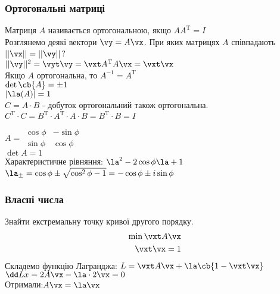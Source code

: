 \subsubsection{Ортогональні матриці}
Матриця $A$ називається ортогональною, якщо $AA^\mathrm{T} = I$\\
Розглянемо деякі вектори $\vy=A\vx$. При яких матрицях $A$ співпадають $||\vx|| = ||\vy||$?\\
$||\vy||^2 = \vyt \vy = \vxt A^\mathrm{T} A \vx = \vxt \vx$\\
Якщо $A$ ортогональна, то $A^{-1} = A^\mathrm{T}$\\
$\det\cb{A}=\pm 1$\\
$|\la(A)|=1$\\
$C=A\cdot B$ - добуток ортогональний також ортогональна.\\
$C^\mathrm{T} \cdot C = B^\mathrm{T} \cdot A^\mathrm{T} \cdot A \cdot B = B^\mathrm{T} \cdot B = I$\\
\begin{exs}
$A=\begin{matrix}
\cos \phi & -\sin\phi \\
\sin\phi & \cos\phi
\end{matrix}$\\
$\det A = 1$ \\
Характеристичне рівняння: $\la^2 - 2\cos\phi \la +1$\\
$\la_\pm = \cos\phi \pm \sqrt{\cos^2\phi - 1} = -\cos\phi \pm i\sin\phi$
\end{exs}
\subsubsection{Власні числа}
Знайти екстремальну точку кривої другого порядку.\\
\begin{eqnarray}
\min \vxt A\vx \\
\vxt \vx = 1
\end{eqnarray}
Складемо функцію Лагранджа: $L = \vxt A \vx + \la\cb{1-\vxt\vx}$\\
$\dd Lx = 2A\vx -\la \cdot 2\vx =0$\\
Отримали:$A\vx = \la\vx$
